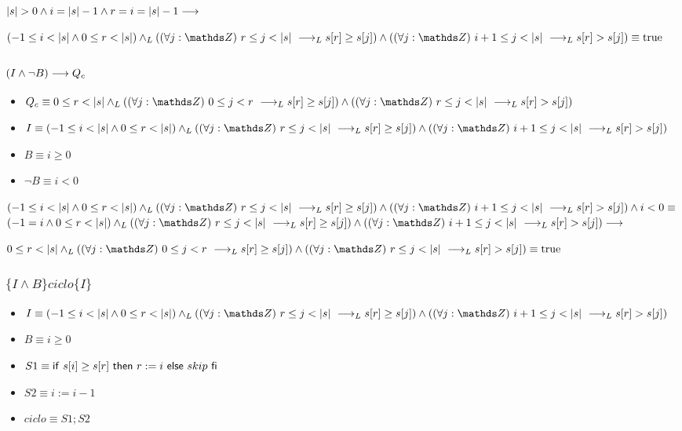 \documentclass{article}
\begin{document}
$|s| > 0 \wedge i = |s| - 1 \wedge r = i = |s| - 1 \longrightarrow$

$(-1 \leq i < \longitud{s} \wedge 0 \leq r < \longitud{s}) \yLuego (\paraTodo{j}{r}{\longitud{s}} \implicaLuego s[r] \geq s[j]) \wedge (\paraTodo{j}{i+1}{\longitud{s}}\implicaLuego s[r] > s[j]) \equiv \True$

\subsubsection*{$ (I \wedge \neg B) \longrightarrow Q_{c} $}

\begin{itemize}
    \item $Q_{c}    \equiv 0 \leq r < \longitud{s} \yLuego (\paraTodo{j}{0}{r} \implicaLuego s[r] \geq s[j]) \wedge (\paraTodo{j}{r}{\longitud{s}}\implicaLuego s[r] > s[j])$
    \item $I        \equiv (-1 \leq i < \longitud{s} \wedge 0 \leq r < \longitud{s}) \yLuego (\paraTodo{j}{r}{\longitud{s}} \implicaLuego s[r] \geq s[j]) \wedge (\paraTodo{j}{i+1}{\longitud{s}}\implicaLuego s[r] > s[j])$
    \item $B        \equiv i \geq 0$
    \item $\neg B   \equiv i < 0$
\end{itemize}

$(-1 \leq i < \longitud{s} \wedge 0 \leq r < \longitud{s}) \yLuego (\paraTodo{j}{r}{\longitud{s}} \implicaLuego s[r] \geq s[j]) \wedge (\paraTodo{j}{i+1}{\longitud{s}}\implicaLuego s[r] > s[j]) \wedge i < 0 \equiv$ \\

$(-1 = i \wedge 0 \leq r < \longitud{s}) \yLuego (\paraTodo{j}{r}{\longitud{s}} \implicaLuego s[r] \geq s[j]) \wedge (\paraTodo{j}{i+1}{\longitud{s}}\implicaLuego s[r] > s[j]) \implica$

$0 \leq r < \longitud{s} \yLuego (\paraTodo{j}{0}{r} \implicaLuego s[r] \geq s[j]) \wedge (\paraTodo{j}{r}{\longitud{s}}\implicaLuego s[r] > s[j]) \equiv \True$

\subsubsection*{$ \{I \wedge B\} ciclo \{I\} $}
\begin{itemize}
    \item $I        \equiv (-1 \leq i < \longitud{s} \wedge 0 \leq r < \longitud{s}) \yLuego (\paraTodo{j}{r}{\longitud{s}} \implicaLuego s[r] \geq s[j]) \wedge (\paraTodo{j}{i+1}{\longitud{s}}\implicaLuego s[r] > s[j])$
    \item $B        \equiv i \geq 0$
    \item $S1       \equiv \mathsf{if}\ s[i] \geq s[r]\ \mathsf{then}\ r:= i\ \mathsf{else}\ skip\ \mathsf{fi}$
    \item $S2       \equiv i:= i - 1$
    \item $ciclo    \equiv S1; S2$
\end{itemize}
\end{document}
